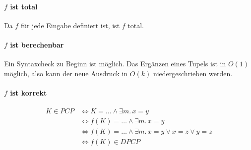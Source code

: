 \paragraph{$f$ ist total} Da $f$ für jede Eingabe definiert ist, ist $f$ total.
\par

\paragraph{$f$ ist berechenbar} Ein Syntaxcheck zu Beginn ist möglich. Das
Ergänzen eines Tupels ist in $O(1)$ möglich, also kann der neue Ausdruck in
$O(k)$ niedergeschrieben werden.
\par

\paragraph{$f$ ist korrekt}
\begin{align*}
	K \in PCP &\iff K = \ldots \land \exists m.\, x = y \\
		  &\iff f(K) = \ldots \land \exists m.\, x = y\\
		  &\iff f(K) = \ldots \land \exists m.\, x = y \lor x = z \lor y
		  = z \\
		  &\iff f(K) \in DPCP
\end{align*}

